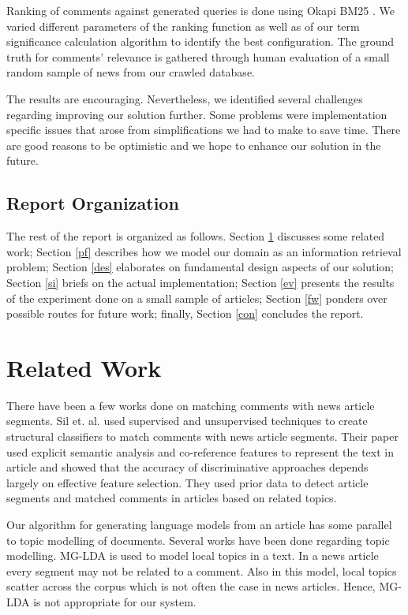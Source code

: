 \documentclass[article]{IEEEtran}
\begin{document}
Ranking of comments against generated queries is done using Okapi BM25 \cite{Robertson96okapiat}. We varied different parameters of the ranking function as well as of our term significance calculation algorithm to identify the best configuration. The ground truth for comments' relevance is gathered through human evaluation of a small random sample of news from our crawled database.

The results are encouraging. Nevertheless, we identified several challenges regarding improving our solution further. Some problems were implementation specific issues that arose from simplifications we had to make to save time. There are good reasons to be optimistic and we hope to enhance our solution in the future.  

\subsection*{Report Organization}
The rest of the report is organized as follows. Section \ref{rw} discusses some related work; Section \ref{pf} describes how we model our domain as an information retrieval problem; Section \ref{des} elaborates on fundamental design aspects of our solution; Section \ref{si} briefs on the actual implementation; Section \ref{ev} presents the results of the experiment done on a small sample of articles; Section \ref{fw} ponders over possible routes for future work; finally, Section \ref{con} concludes the report.                

\section{Related Work}
\label{rw}
There have been a few works done on matching comments with news article segments. Sil et. al. \cite{Sil:2011:SMC:2063576.2063906} used supervised and unsupervised techniques to create structural classifiers to match comments with news article segments. Their paper used explicit semantic analysis and co-reference features to represent the text in article and showed that the accuracy of discriminative approaches depends largely on effective feature selection. They used prior data to detect article segments and matched comments in articles based on related topics.

Our algorithm for generating language models from an article has some parallel to topic modelling of documents. Several works have been done regarding topic modelling. MG-LDA \cite{Blei:2003:MAD:860435.860460, Titov:2008:MOR:1367497.1367513} is used to model local topics in a text. In a news article every segment may not be related to a comment. Also in this model, local topics scatter across the corpus which is not often the case in news articles. Hence, MG-LDA is not appropriate for our system. 
\end{document}
